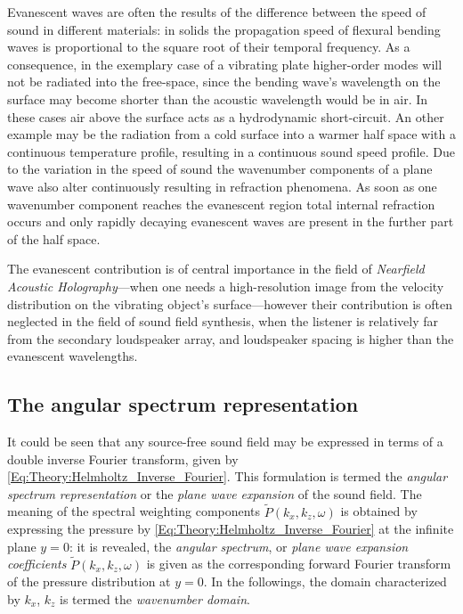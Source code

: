 %
Evanescent waves are often the results of the difference between the speed of sound in different materials: in solids the propagation speed of flexural bending waves is proportional to the square root of their temporal frequency. 
As a consequence, in the exemplary case of a vibrating plate higher-order modes will not be radiated into the free-space, since the bending wave's wavelength on the surface may become shorter than the acoustic wavelength would be in air. 
In these cases air above the surface acts as a hydrodynamic short-circuit.
An other example may be the radiation from a cold surface into a warmer half space with a continuous temperature profile, resulting in a continuous sound speed profile.
Due to the variation in the speed of sound the wavenumber components of a plane wave also alter continuously resulting in refraction phenomena.
As soon as one wavenumber component reaches the evanescent region total internal refraction occurs and only rapidly decaying evanescent waves are present in the further part of the half space.

%
The evanescent contribution is of central importance in the field of \emph{Nearfield Acoustic Holography}---when one needs a high-resolution image from the velocity distribution on the vibrating object's surface---however their contribution is often neglected in the field of sound field synthesis, when the listener is relatively far from the secondary loudspeaker array, and loudspeaker spacing is higher than the evanescent wavelengths.

%
\subsection{The angular spectrum representation}

It could be seen that any source-free sound field may be expressed in terms of a double inverse Fourier transform, given by \eqref{Eq:Theory:Helmholtz_Inverse_Fourier}.
This formulation is termed the \emph{angular spectrum representation} \cite{Ahrens2010phd, Ahrens2012, Williams1999} or the \emph{plane wave expansion} \cite{Spors2005} of the sound field.
The meaning of the spectral weighting components $\tilde{P}(k_x,k_z,\omega)$ is obtained by expressing the pressure by \eqref{Eq:Theory:Helmholtz_Inverse_Fourier} at the infinite plane $y=0$: it is revealed, the \emph{angular spectrum}, or \emph{plane wave expansion coefficients} $\tilde{P}(k_x,k_z, \omega)$ is given as the corresponding forward Fourier transform of the pressure distribution at $y=0$.
In the followings, the domain characterized by $k_x$, $k_z$ is termed the \emph{wavenumber domain}.

